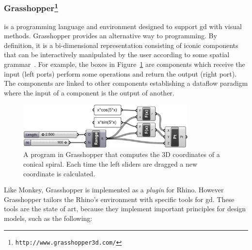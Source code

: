 \subsubsection{Grasshopper\protect\footnote{\texttt{http://www.grasshopper3d.com/}}} is a programming language and environment designed to support \ac{gd} with visual methods. Grasshopper provides an alternative way to programming. By definition, it is a bi-dimensional representation consisting of iconic components that can be interactively manipulated by the user according to some spatial grammar~\cite{myers1990taxonomies}. For example, the boxes in Figure~\ref{fig:grass} are components which receive the input (left ports) perform some operations and return the output (right port). The components are linked to other components establishing a dataflow paradigm where the input of a component is the output of another.

\begin{figure}[!htbp]
  \centering
  \includegraphics[width=0.8\textwidth]{img/grasshopper}
    \caption{A program in Grasshopper that computes the 3D coordinates of a conical spiral. Each time the left sliders are dragged a new coordinate is calculated.}
  \label{fig:grass}
\end{figure}

Like Monkey, Grasshopper is implemented as a \textit{plugin} for Rhino\footnotemark[\ref{rhin}]. However Grasshopper tailors the Rhino's environment with specific tools for \ac{gd}. These tools are the state of art, because they implement important principles for design models, such as the following:

